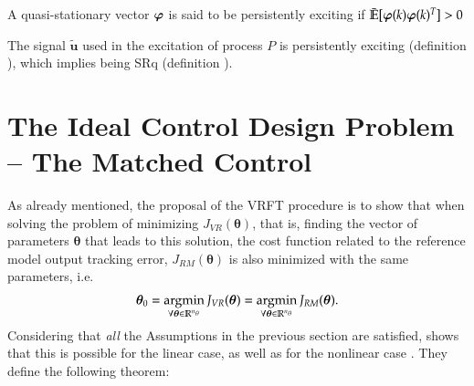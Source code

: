 \begin{defn} \label{def:PoE}
   A quasi-stationary vector $\bm{\varphi}$ is said to be persistently exciting if $\bar{\mathbb{E}}[\bm{\varphi}(k)\bm{\varphi}(k)^{T}] > 0$
\end{defn}

\begin{assum}
   The signal $\tilde{\bm{u}}$ used in the excitation of process $P$ is persistently exciting (definition \label{def:PoE}), which implies being SRq (definition \label{def:SRq}).
\end{assum}



%

\section{The Ideal Control Design Problem -- The Matched Control}%
\label{sec:the_ideal_control_design_problem}

As already mentioned, the proposal of the VRFT procedure is to show that when solving the problem of minimizing $J_{VR}(\bm{\theta})$, that is, finding the vector of parameters $\bm{\theta}$ that leads to this solution, the cost function related to the reference model output tracking error, $J_{RM}(\bm{\theta})$ is also minimized with the same parameters, i.e.
\begin{equation}
   \bm{\theta}_0 = \operatorname*{argmin}_{\forall \bm{\theta} \in \mathbb{R}^{n_\theta}} J_{VR}(\bm{\theta}) = \operatorname*{argmin}_{\forall \bm{\theta} \in \mathbb{R}^{n_\theta}} J_{RM}(\bm{\theta}).
\label{eq:theta_JVR_JRM}
\end{equation}
Considering that \textit{all} the Assumptions in the previous section are satisfied, \cite{campi2002} shows that this is possible for the linear case, as well as for the nonlinear case \citep{campi2006}. They define the following theorem:

